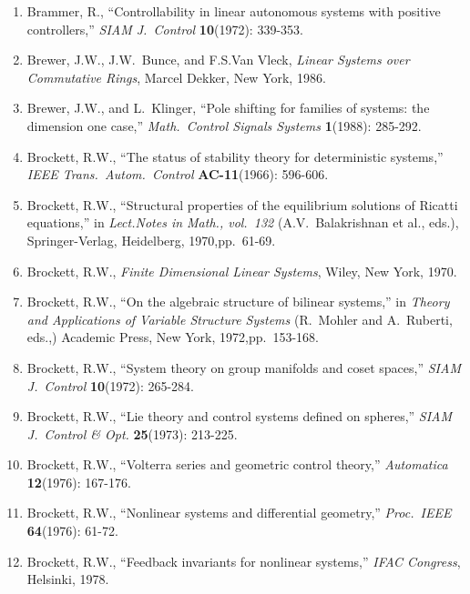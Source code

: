 \begin{enumerate}
\item
Brammer, R., ``Controllability in linear autonomous systems with positive
controllers,'' {\it SIAM J.\ Control} {\bf 10}(1972): 339-353.

\item
Brewer, J.W., J.W.\ Bunce, and F.S.Van Vleck, {\it Linear Systems over
Commutative Rings}, Marcel Dekker, New York, 1986.

\item
Brewer, J.W., and L.\ Klinger, ``Pole shifting for families of systems: the
dimension one case,'' {\it Math.\ Control Signals Systems} {\bf 1}(1988):
285-292.

\item
Brockett, R.W., ``The status of stability theory for deterministic systems,''
{\it IEEE Trans.\ Autom.\ Control} {\bf AC-11}(1966): 596-606.

\item
Brockett, R.W., ``Structural properties of the equilibrium solutions of
Ricatti equations,'' in {\it Lect.Notes in Math., vol.\ 132} (A.V.\
Balakrishnan et al., eds.), Springer-Verlag, Heidelberg, 1970,pp.\ 61-69.

\item
Brockett, R.W., {\it Finite Dimensional Linear Systems}, Wiley, New York,
1970.

\item
Brockett, R.W., ``On the algebraic structure of bilinear systems,'' in {\it
Theory and Applications of Variable Structure Systems} (R.\ Mohler and A.\
Ruberti, eds.,) Academic Press, New York, 1972,pp.\ 153-168.

\item
Brockett, R.W., ``System theory on group manifolds and coset spaces,'' {\it
SIAM J.\ Control} {\bf 10}(1972): 265-284.

\item
Brockett, R.W., ``Lie theory and control systems defined on spheres,'' {\it
SIAM J.\ Control \& Opt.} {\bf 25}(1973): 213-225.

\item
Brockett, R.W., ``Volterra series and geometric control theory,'' {\it
Automatica} {\bf 12}(1976): 167-176.

\item
Brockett, R.W., ``Nonlinear systems and differential geometry,'' {\it Proc.\
IEEE} {\bf 64}(1976): 61-72.

\item
Brockett, R.W., ``Feedback invariants for nonlinear systems,'' {\it IFAC
Congress}, Helsinki, 1978.


\end{enumerate}
